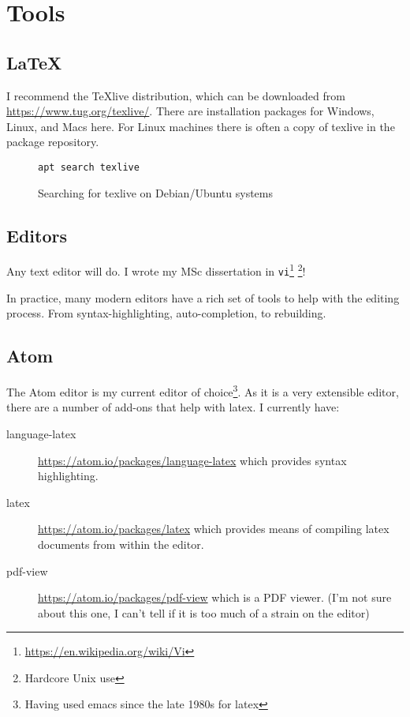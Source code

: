 
\chapter{Tools}

\section{\LaTeX}
I recommend the \TeX live distribution, which can be downloaded from
\url{https://www.tug.org/texlive/}.  There are installation packages for Windows, Linux, and Macs here.  For Linux machines there is often a copy of texlive in the package repository.

\begin{figure}
\begin{verbatim}
apt search texlive
\end{verbatim}
    \caption{Searching for texlive on Debian/Ubuntu systems}
    \label{}
\end{figure}

\section{Editors}
Any text editor will do.   I wrote my MSc dissertation in \texttt{vi}\footnote{\url{https://en.wikipedia.org/wiki/Vi}}
\footnote{Hardcore Unix use}!

In practice, many modern editors have a rich set of tools to help with the editing process.  From syntax-highlighting, auto-completion, to rebuilding.

\section{Atom}
The Atom editor is my current editor of choice\footnote{Having used emacs since the late 1980s for latex}.  As it is a very extensible editor, there are a number of add-ons that help with latex.  I currently have:

\begin{description}
    \item[language-latex] \url{https://atom.io/packages/language-latex} which provides syntax highlighting.
    \item[latex] \url{https://atom.io/packages/latex} which provides means of compiling latex documents from within the editor.
    \item[pdf-view] \url{https://atom.io/packages/pdf-view} which is a PDF viewer.  (I'm not sure about this one, I can't tell if it is too much of a strain on the editor)
\end{description}

